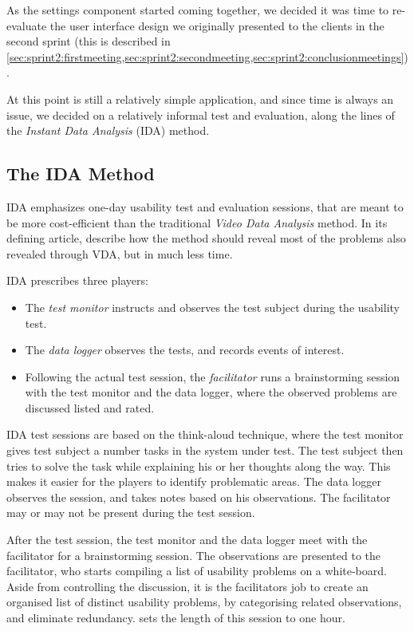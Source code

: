 As the settings component started coming together, we decided it was time to re-evaluate the user interface design we originally presented to the clients in the second sprint (this is described in \cref{sec:sprint2:firstmeeting,sec:sprint2:secondmeeting,sec:sprint2:conclusionmeetings}).

At this point \launcher is still a relatively simple application, and since time is always an issue, we decided on a relatively informal test and evaluation, along the lines of the \textit{Instant Data Analysis} (IDA) method. 

\subsection{The IDA Method}
IDA emphasizes one-day usability test and evaluation sessions, that are meant to be more cost-efficient than the traditional \textit{Video Data Analysis} method. In its defining article, \citet{idaArticle} describe how the method should reveal most of the problems also revealed through VDA, but in much less time. 

IDA prescribes three players: 
\begin{itemize}
	\item The \textit{test monitor} instructs and observes the test subject during the usability test.
	\item The \textit{data logger} observes the tests, and records events of interest.
	\item Following the actual test session, the \textit{facilitator} runs a brainstorming session with the test monitor and the data logger, where the observed problems are discussed listed and rated. 
\end{itemize}

IDA test sessions are based on the think-aloud technique, where the test monitor gives test subject a number tasks in the system under test. The test subject then tries to solve the task while explaining his or her thoughts along the way. This makes it easier for the players to identify problematic areas. The data logger observes the session, and takes notes based on his observations. The facilitator may or may not be present during the test session.

After the test session, the test monitor and the data logger meet with the facilitator for a brainstorming session. The observations are presented to the facilitator, who starts compiling a list of usability problems on a white-board. Aside from controlling the discussion, it is the facilitators job to create an organised list of distinct usability problems, by categorising related observations, and eliminate redundancy. \citet{idaArticle} sets the length of this session to one hour. 

